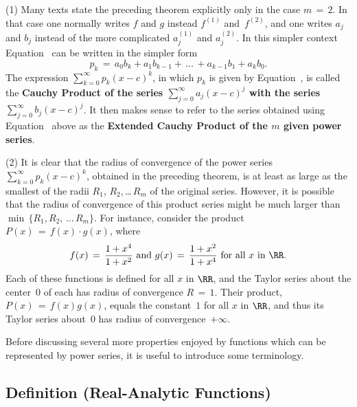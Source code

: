         \hspace*{\parindent}(1) Many texts state the preceding theorem explicitly only in the case $m \,=\, 2$.
    In that case one normally writes $f$ and $g$ instead $f^{(1)}$ and~$f^{(2)}$,
    and one writes $a_{j}$ and $b_{j}$ instead of the more complicated $a^{(1)}_{j}$ and $a^{(2)}_{j}$.
    In this simpler context Equation~ can be written in the simpler form
        \begin{equation}
        \label{EqnG.100}
        p_{k} \,=\, a_{0}b_{k} + a_{1}b_{k-1} + \,{\ldots}\, + a_{k-1}b_{1} + a_{k}b_{0}.
        \end{equation}
    The expression $\sum_{k=0}^{{\infty}} p_{k}(x-c)^{k}$, in which $p_{k}$ is given by Equation~,
    is called the {\bf Cauchy Product of the series $\sum_{j=0}^{{\infty}} a_{j}(x-c)^{j}$ with the series $\sum_{j=0}^{{\infty}} b_{j}(x-c)^{j}$}.
    It then makes sense to refer to the series obtained using Equation~ above as the {\bf Extended Cauchy Product of the $m$ given power series}.

\V

        (2) It is clear that the radius of convergence of the power series $\sum_{k=0}^{{\infty}} p_{k}(x-c)^{k}$, obtained in the preceding theorem,
    is at least as large as the smallest of the radii $R_{1}$, $R_{2}$,\,{\ldots}\,$R_{m}$ of the original series.
    However, it is possible that the radius of convergence of this product series might be much larger than ${\min}\,\{R_{1},R_{2},\,{\ldots}\,R_{m}\}$.
    For instance, consider the product $P(x) \,=\, f(x){\cdot}g(x)$, where
        \begin{displaymath}
        f(x) \,=\, \frac{1+x^{4}}{1+x^{2}} \mbox{ and }
        g(x) \,=\, \frac{1+x^{2}}{1+x^{4}} \mbox{ for all $x$ in ${\RR}$}.
        \end{displaymath}
   Each of these functions is defined for all $x$ in ${\RR}$, and the Taylor series about the center~$0$ of each has radius of convergence $R \,=\, 1$.
    Their product, $P(x) \,=\, f(x)g(x)$, equals the constant~$1$ for all $x$ in ${\RR}$, and thus its Taylor series about~$0$ has radius of convergence~$+{\infty}$.

\V
\V

        Before discussing several more properties enjoyed by functions which can be represented by power series, it is useful to introduce some terminology.

\V

        \subsection{\small{{\bf Definition}} (Real-Analytic Functions)}
        \label{DefG60.110}

